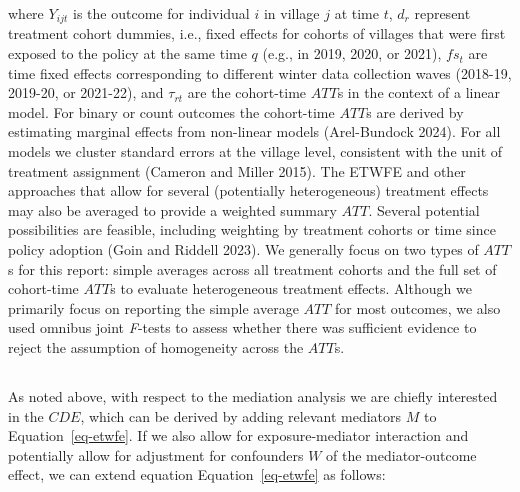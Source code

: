 \documentclass[
  letterpaper,
  DIV=11,
  numbers=noendperiod]{scrartcl}
\providecommand{\DIFadd}[1]{{\protect\color{blue}\uwave{#1}}} %
\providecommand{\DIFaddbegin}{} %
\providecommand{\DIFaddend}{} %
\providecommand{\DIFdelbegin}{} %
\providecommand{\DIFdelend}{} %
\newcommand{\DIFscaledelfig}{0.5}
\newlength{\DIFdelgraphicswidth} %
\newlength{\DIFdelgraphicsheight} %
\newcommand{\DIFaddincludegraphics}[2][]{{\color{blue}\fbox{\DIFOincludegraphics[#1]{#2}}}} %
\newcommand{\DIFdelincludegraphics}[2][]{%
\sbox{\DIFdelgraphicsbox}{\DIFOincludegraphics[#1]{#2}}%
\settoboxwidth{\DIFdelgraphicswidth}{\DIFdelgraphicsbox} %
\settoboxtotalheight{\DIFdelgraphicsheight}{\DIFdelgraphicsbox} %
\scalebox{\DIFscaledelfig}{%
\parbox[b]{\DIFdelgraphicswidth}{\usebox{\DIFdelgraphicsbox}\\[-\baselineskip] \rule{\DIFdelgraphicswidth}{0em}}\llap{\resizebox{\DIFdelgraphicswidth}{\DIFdelgraphicsheight}{%
\setlength{\unitlength}{\DIFdelgraphicswidth}%
\begin{picture}(1,1)%
\thicklines\linethickness{2pt} %
{\color[rgb]{1,0,0}\put(0,0){\framebox(1,1){}}}%
{\color[rgb]{1,0,0}\put(0,0){\line( 1,1){1}}}%
{\color[rgb]{1,0,0}\put(0,1){\line(1,-1){1}}}%
\end{picture}%
}\hspace*{3pt}}} %
} %
\DeclareRobustCommand{\DIFaddbegin}{\DIFOaddbegin \let\includegraphics\DIFaddincludegraphics} %
\DeclareRobustCommand{\DIFaddend}{\DIFOaddend \let\includegraphics\DIFOincludegraphics} %
\DeclareRobustCommand{\DIFdelbegin}{\DIFOdelbegin \let\includegraphics\DIFdelincludegraphics} %
\DeclareRobustCommand{\DIFdelend}{\DIFOaddend \let\includegraphics\DIFOincludegraphics} %
\begin{document}
where \(Y_{ijt}\) is the outcome for individual \(i\) in village \(j\)
at time \(t\), \(d_{r}\) represent treatment cohort dummies, i.e., fixed
effects for cohorts of villages that were first exposed to the policy at
the same time \(q\) (e.g., in 2019, 2020, or 2021), \(fs_{t}\) are time
fixed effects corresponding to different winter data collection waves
(2018-19, 2019-20, or 2021-22), and \(\tau_{rt}\) are the cohort-time
\(ATT\)s in the context of a linear model. For binary or count outcomes
the cohort-time \(ATT\)s are derived by estimating marginal effects from
non-linear models (Arel-Bundock 2024). For all models we cluster
standard errors at the village level, consistent with the unit of
treatment assignment (Cameron and Miller 2015). The ETWFE and other
approaches that allow for several (potentially heterogeneous) treatment
effects may also be averaged to provide a weighted summary \(ATT\).
Several potential possibilities are feasible, including weighting by
treatment cohorts or time since policy adoption (Goin and Riddell 2023).
We generally focus on two types of \(ATT\)s for this report: simple
averages across all treatment cohorts and the full set of cohort-time
\(ATT\)s to evaluate heterogeneous treatment effects. Although we
primarily focus on reporting the simple average \(ATT\) for most
outcomes, we also used omnibus joint \emph{F}-tests to assess whether
there was sufficient evidence to reject the assumption of homogeneity
across the \(ATT\)s.

\DIFdelbegin %
\DIFdelend \DIFaddbegin \subsection{\DIFadd{Mediation Analysis}}\label{mediation-analysis}
\DIFaddend 

As noted above, with respect to the mediation analysis we are chiefly
interested in the \(CDE\), which can be derived by adding relevant
mediators \(M\) to Equation~\ref{eq-etwfe}. If we also allow for
exposure-mediator interaction and potentially allow for adjustment for
confounders \(W\) of the mediator-outcome effect, we can extend equation
Equation~\ref{eq-etwfe} as follows:
\end{document}
